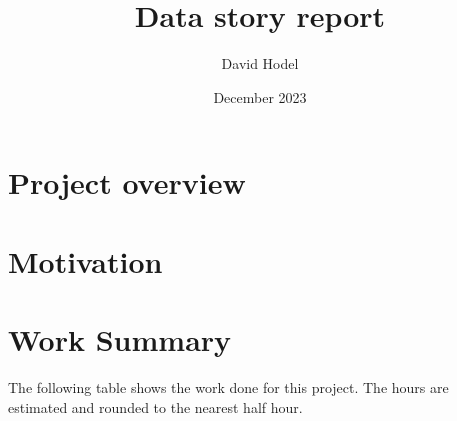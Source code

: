 \documentclass{article}
\title{Data story report}
\author{David Hodel}
\date{December 2023}
\begin{document}
\maketitle
\newpage

\tableofcontents
\newpage

\section{Project overview}


\newpage

\section{Motivation}


\newpage

\section{Work Summary}

The following table shows the work done for this project.
The hours are estimated and rounded to the nearest half hour.
\end{document}
